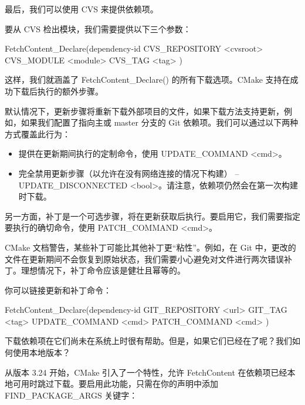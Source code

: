 最后，我们可以使用 CVS 来提供依赖项。


要从 CVS 检出模块，我们需要提供以下三个参数：

\begin{shell}
FetchContent_Declare(dependency-id
                     CVS_REPOSITORY <cvsroot>
                     CVS_MODULE <module>
                     CVS_TAG <tag>
)
\end{shell}

这样，我们就涵盖了 FetchContent\_Declare() 的所有下载选项。CMake 支持在成功下载后执行的额外步骤。


默认情况下，更新步骤将重新下载外部项目的文件，如果下载方法支持更新，例如，如果我们配置了指向主或 master 分支的 Git 依赖项。我们可以通过以下两种方式覆盖此行为：

\begin{itemize}
\item
提供在更新期间执行的定制命令，使用 UPDATE\_COMMAND <cmd>。

\item
完全禁用更新步骤（以允许在没有网络连接的情况下构建） – UPDATE\_DISCONNECTED <bool>。请注意，依赖项仍然会在第一次构建时下载。
\end{itemize}

另一方面，补丁是一个可选步骤，将在更新获取后执行。要启用它，我们需要指定要执行的确切命令，使用 PATCH\_COMMAND <cmd>。

CMake 文档警告，某些补丁可能比其他补丁更“粘性”。例如，在 Git 中，更改的文件在更新期间不会恢复到原始状态，我们需要小心避免对文件进行两次错误补丁。理想情况下，补丁命令应该是健壮且幂等的。

你可以链接更新和补丁命令：

\begin{shell}
FetchContent_Declare(dependency-id
                     GIT_REPOSITORY <url>
                     GIT_TAG <tag>
                     UPDATE_COMMAND <cmd>
                     PATCH_COMMAND <cmd>
)
\end{shell}

下载依赖项在它们尚未在系统上时很有帮助。但是，如果它们已经在了呢？我们如何使用本地版本？


从版本 3.24 开始，CMake 引入了一个特性，允许 FetchContent 在依赖项已经本地可用时跳过下载。要启用此功能，只需在你的声明中添加 FIND\_PACKAGE\_ARGS 关键字：

